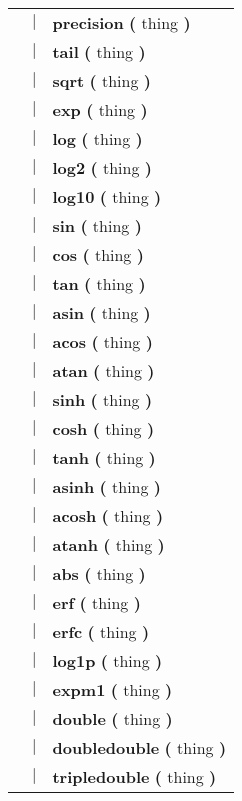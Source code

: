 \begin{tabular}{lcl}
 & $|$ & \textbf{precision} \textbf{(} thing \textbf{)} \\
 & $|$ & \textbf{tail} \textbf{(} thing \textbf{)} \\
 & $|$ & \textbf{sqrt} \textbf{(} thing \textbf{)} \\
 & $|$ & \textbf{exp} \textbf{(} thing \textbf{)} \\
 & $|$ & \textbf{log} \textbf{(} thing \textbf{)} \\
 & $|$ & \textbf{log2} \textbf{(} thing \textbf{)} \\
 & $|$ & \textbf{log10} \textbf{(} thing \textbf{)} \\
 & $|$ & \textbf{sin} \textbf{(} thing \textbf{)} \\
 & $|$ & \textbf{cos} \textbf{(} thing \textbf{)} \\
 & $|$ & \textbf{tan} \textbf{(} thing \textbf{)} \\
 & $|$ & \textbf{asin} \textbf{(} thing \textbf{)} \\
 & $|$ & \textbf{acos} \textbf{(} thing \textbf{)} \\
 & $|$ & \textbf{atan} \textbf{(} thing \textbf{)} \\
 & $|$ & \textbf{sinh} \textbf{(} thing \textbf{)} \\
 & $|$ & \textbf{cosh} \textbf{(} thing \textbf{)} \\
 & $|$ & \textbf{tanh} \textbf{(} thing \textbf{)} \\
 & $|$ & \textbf{asinh} \textbf{(} thing \textbf{)} \\
 & $|$ & \textbf{acosh} \textbf{(} thing \textbf{)} \\
 & $|$ & \textbf{atanh} \textbf{(} thing \textbf{)} \\
 & $|$ & \textbf{abs} \textbf{(} thing \textbf{)} \\
 & $|$ & \textbf{erf} \textbf{(} thing \textbf{)} \\
 & $|$ & \textbf{erfc} \textbf{(} thing \textbf{)} \\
 & $|$ & \textbf{log1p} \textbf{(} thing \textbf{)} \\
 & $|$ & \textbf{expm1} \textbf{(} thing \textbf{)} \\
 & $|$ & \textbf{double} \textbf{(} thing \textbf{)} \\
 & $|$ & \textbf{doubledouble} \textbf{(} thing \textbf{)} \\
 & $|$ & \textbf{tripledouble} \textbf{(} thing \textbf{)} \\

\end{tabular}
